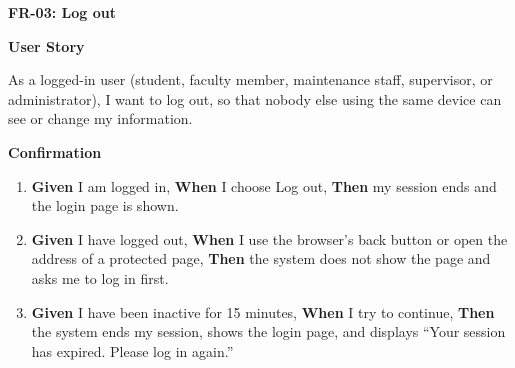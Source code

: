 \noindent\textbf{FR-03: Log out}\par\nopagebreak[4]\smallskip
\noindent\textbf{User Story}\par\nopagebreak[4]
\noindent As a logged-in user (student, faculty member, maintenance staff, supervisor, or administrator), I want to log out, so that nobody else using the same device can see or change my information.\par\smallskip
{\makeatletter
{}
\makeatother
\noindent\textbf{Confirmation}\par\nopagebreak[4]\vspace{-6pt}\nopagebreak[4]
\begin{enumerate}\setlength{\itemsep}{2pt}\setlength{\parsep}{0pt}\setlength{\topsep}{2pt}\setlength{\partopsep}{0pt}
  \item \textbf{Given} I am logged in, \textbf{When} I choose Log out, \textbf{Then} my session ends and the login page is shown.
  \item \textbf{Given} I have logged out, \textbf{When} I use the browser's back button or open the address of a protected page, \textbf{Then} the system does not show the page and asks me to log in first.
  \item \textbf{Given} I have been inactive for 15 minutes, \textbf{When} I try to continue, \textbf{Then} the system ends my session, shows the login page, and displays ``Your session has expired. Please log in again.''
\end{enumerate}}
\medskip
 
